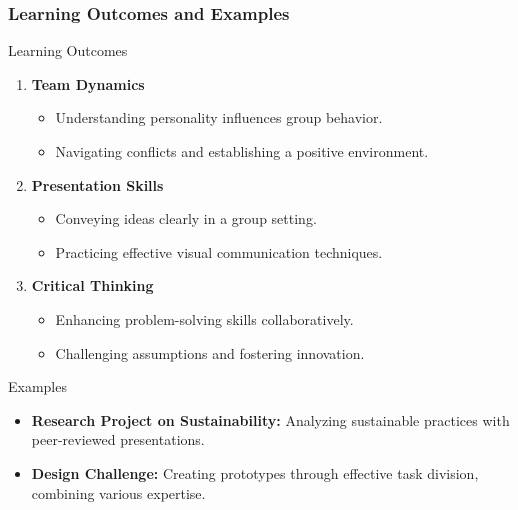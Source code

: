 \documentclass[aspectratio=169]{beamer}
\begin{document}
\begin{frame}[fragile]
    \frametitle{Learning Outcomes and Examples}
    \begin{block}{Learning Outcomes}
        \begin{enumerate}
            \item \textbf{Team Dynamics}
                \begin{itemize}
                    \item Understanding personality influences group behavior.
                    \item Navigating conflicts and establishing a positive environment.
                \end{itemize}
            \item \textbf{Presentation Skills}
                \begin{itemize}
                    \item Conveying ideas clearly in a group setting.
                    \item Practicing effective visual communication techniques.
                \end{itemize}
            \item \textbf{Critical Thinking}
                \begin{itemize}
                    \item Enhancing problem-solving skills collaboratively.
                    \item Challenging assumptions and fostering innovation.
                \end{itemize}
        \end{enumerate}
    \end{block}
    \begin{block}{Examples}
        \begin{itemize}
            \item \textbf{Research Project on Sustainability:} Analyzing sustainable practices with peer-reviewed presentations.
            \item \textbf{Design Challenge:} Creating prototypes through effective task division, combining various expertise.
        \end{itemize}
    \end{block}
\end{frame}
\end{document}
